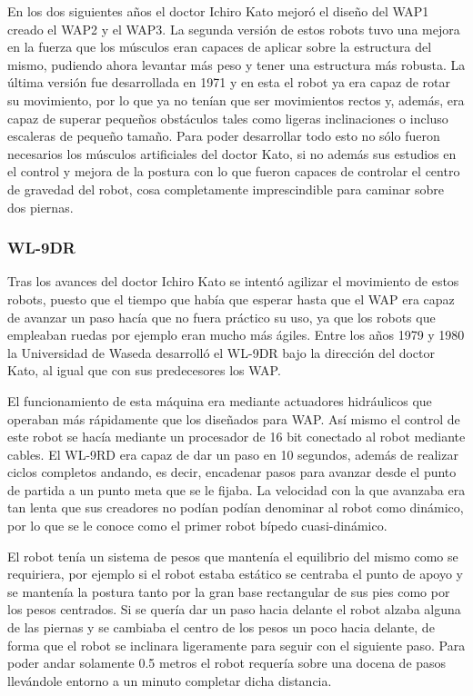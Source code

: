 \vspace{10px}

En los dos siguientes años el doctor Ichiro Kato mejoró el diseño del WAP1 creado el WAP2 y el WAP3. La segunda versión de estos robots tuvo una mejora en la fuerza que los músculos eran capaces de aplicar sobre la estructura del mismo, pudiendo ahora levantar más peso y tener una estructura más robusta. La última versión fue desarrollada en 1971 y en esta el robot ya era capaz de rotar su movimiento, por lo que ya no tenían que ser movimientos rectos y, además, era capaz de superar pequeños obstáculos tales como ligeras inclinaciones o incluso escaleras de pequeño tamaño. Para poder desarrollar todo esto no sólo fueron necesarios los músculos artificiales del doctor Kato, si no además sus estudios en el control y mejora de la postura con lo que fueron capaces de controlar el centro de gravedad del robot, cosa completamente imprescindible para caminar sobre dos piernas.

\subsubsection{WL-9DR}
Tras los avances del doctor Ichiro Kato se intentó agilizar el movimiento de estos robots, puesto que el tiempo que había que esperar hasta que el WAP era capaz de avanzar un paso hacía que no fuera práctico su uso, ya que los robots que empleaban ruedas por ejemplo eran mucho más ágiles. Entre los años 1979 y 1980 la Universidad de Waseda desarrolló el WL-9DR bajo la dirección del doctor Kato, al igual que con sus predecesores los WAP.

\vspace{10px}

El funcionamiento de esta máquina era mediante actuadores hidráulicos que operaban más rápidamente que los diseñados para WAP. Así mismo el control de este robot se hacía mediante un procesador de 16 bit conectado al robot mediante cables. El WL-9RD era capaz de dar un paso en 10 segundos, además de realizar ciclos completos andando, es decir, encadenar pasos para avanzar desde el punto de partida a un punto meta que se le fijaba. La velocidad con la que avanzaba era tan lenta que sus creadores no podían podían denominar al robot como dinámico, por lo que se le conoce como el primer robot bípedo cuasi-dinámico.

\vspace{10px}

El robot tenía un sistema de pesos que mantenía el equilibrio del mismo como se requiriera, por ejemplo si el robot estaba estático se centraba el punto de apoyo y se mantenía la postura tanto por la gran base rectangular de sus pies como por los pesos centrados. Si se quería dar un paso hacia delante el robot alzaba alguna de las piernas y se cambiaba el centro de los pesos un poco hacia delante, de forma que el robot se inclinara ligeramente para seguir con el siguiente paso. Para poder andar solamente 0.5 metros el robot requería sobre una docena de pasos llevándole entorno a un minuto completar dicha distancia.

